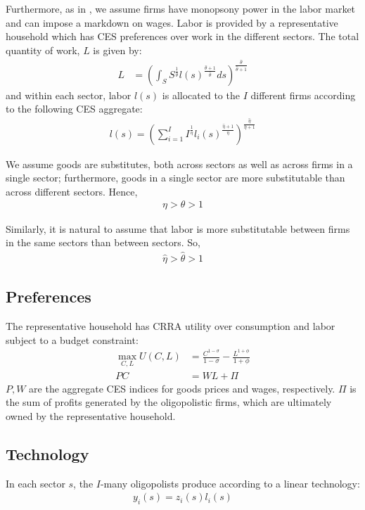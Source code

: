 \documentclass[12pt]{article}%
\begin{document}
Furthermore, as in \citet{Deb-et-al_2024}, we assume firms have monopsony power in the labor market and can impose a markdown on wages. Labor is provided by a representative household which has CES preferences over work in the different sectors. The total quantity of work, $L$ is given by:
\begin{align*}
    L &= \left( \int_{S} S^{\frac{1}{\hat{\theta}}} l(s)^{\frac{\hat{\theta} + 1}{\hat{\theta}}} ds \right) ^{\frac{\hat{\theta}}{\hat{\theta} + 1}}
\end{align*}
and within each sector, labor $l(s)$ is allocated to the $I$ different firms according to the following CES aggregate:
\begin{align*}
    l(s) = \left( \sum_{i=1} ^I I^{\frac{1}{\hat{\eta}}} l_i(s)^{\frac{\hat{\eta} + 1}{\hat{\eta}}} \right) ^{\frac{\hat{\eta}}{\hat{\eta} + 1}}
\end{align*}

We assume goods are substitutes, both across sectors as well as across firms in a single sector; furthermore, goods in a single sector are more substitutable than across different sectors. Hence,
\begin{align*}
    \eta > \theta > 1
\end{align*}

Similarly, it is natural to assume that labor is more substitutable between firms in the same sectors than between sectors. So,
\begin{align*}
    \hat{\eta} > \hat{\theta} > 1
\end{align*}



\subsection{Preferences}
The representative household has CRRA utility over consumption and labor subject to a budget constraint:
\begin{align} \label{HH_problem}
    \max_{C,L} U(C, L) &= \frac{C^{1-\sigma}}{1-\sigma} - \frac{L^{1+\phi}}{1+\phi} \\
    P C &= W L + \Pi
\end{align}
$P, W$ are the aggregate CES indices for goods prices and wages, respectively. $\Pi$ is the sum of profits generated by the oligopolistic firms, which are ultimately owned by the representative household.



\subsection{Technology}
In each sector $s$, the $I$-many oligopolists produce according to a linear technology:
\begin{align} \label{firm_technology}
    y_i(s) = z_i(s) l_i(s)
\end{align}
\end{document}
